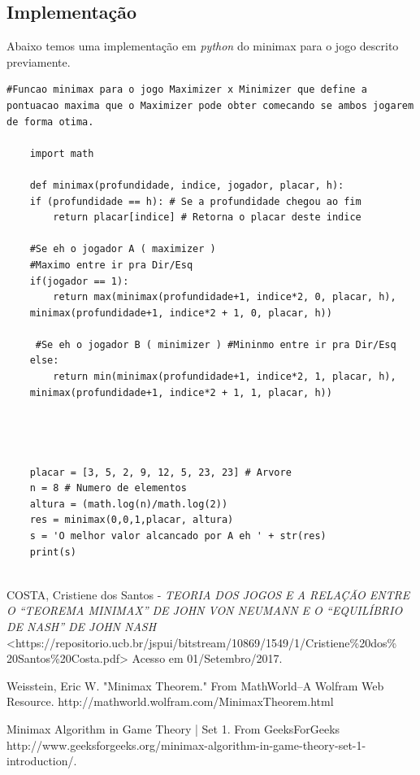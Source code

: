 \documentclass[]{article}
\begin{document}
\subsection{Implementação}
 Abaixo temos uma implementação em \emph{python} do minimax para o jogo descrito previamente.
	\begin{lstlisting}[]
	#Funcao minimax para o jogo Maximizer x Minimizer que define a pontuacao maxima que o Maximizer pode obter comecando se ambos jogarem de forma otima.
	
	import math
	
	def minimax(profundidade, indice, jogador, placar, h):
	if (profundidade == h): # Se a profundidade chegou ao fim
		return placar[indice] # Retorna o placar deste indice	
	
	#Se eh o jogador A ( maximizer )
	#Maximo entre ir pra Dir/Esq
	if(jogador == 1): 
		return max(minimax(profundidade+1, indice*2, 0, placar, h),  
	minimax(profundidade+1, indice*2 + 1, 0, placar, h)) 
	
	 #Se eh o jogador B ( minimizer ) #Mininmo entre ir pra Dir/Esq
	else:
		return min(minimax(profundidade+1, indice*2, 1, placar, h), 
	minimax(profundidade+1, indice*2 + 1, 1, placar, h))
	
	
	
	
	placar = [3, 5, 2, 9, 12, 5, 23, 23] # Arvore
	n = 8 # Numero de elementos
	altura = (math.log(n)/math.log(2))
	res = minimax(0,0,1,placar, altura)
	s = 'O melhor valor alcancado por A eh ' + str(res)
	print(s)
	
	\end{lstlisting}
	
\begin{thebibliography}{1}
	 COSTA, Cristiene dos Santos - \textit{TEORIA DOS JOGOS E A RELAÇÃO ENTRE O “TEOREMA MINIMAX” DE JOHN VON NEUMANN E O “EQUILÍBRIO DE NASH” DE JOHN NASH} <https://repositorio.ucb.br/jspui/bitstream/10869/1549/1/Cristiene\%20dos\%
	20Santos\%20Costa.pdf> Acesso em 01/Setembro/2017.
	
	 Weisstein, Eric W. "Minimax Theorem." From MathWorld--A Wolfram Web Resource. http://mathworld.wolfram.com/MinimaxTheorem.html
	
	 Minimax Algorithm in Game Theory | Set 1. From GeeksForGeeks  http://www.geeksforgeeks.org/minimax-algorithm-in-game-theory-set-1-introduction/.
	
\end{thebibliography}	 
	
\end{document}
